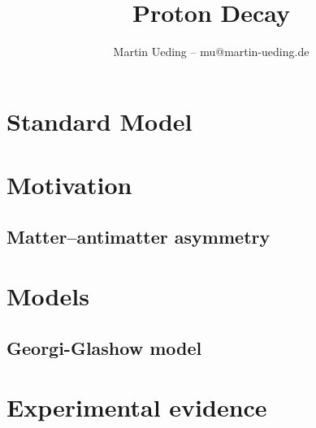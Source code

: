 \documentclass[english, fleqn]{beamer}
\title{Proton Decay}
\author{Martin Ueding -- mu@martin-ueding.de}
\begin{document}
\begin{frame}
    \titlepage
\end{frame}

\section{Standard Model}

\section{Motivation}

\subsection{Matter--antimatter asymmetry}

\section{Models}

\subsection{Georgi-Glashow model}

\begin{frame}
    
\end{frame}

\section{Experimental evidence}
\end{document}

